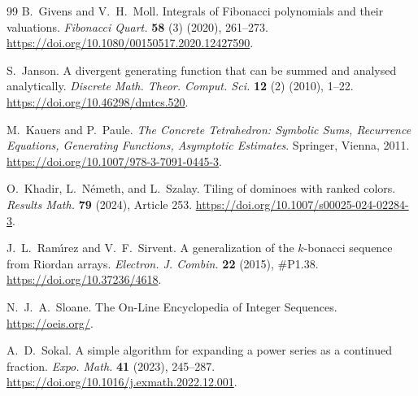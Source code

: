 \documentclass[11pt]{amsart}
\theoremstyle{plain}
\numberwithin{equation}{section}
\begin{document}
\begin{thebibliography}{99}
B.~Givens and V.~H.~Moll.
\newblock Integrals of Fibonacci polynomials and their valuations.
\newblock \emph{Fibonacci Quart.} \textbf{58} (3) (2020), 261--273.
\newblock \url{https://doi.org/10.1080/00150517.2020.12427590}.


S.~Janson.
\newblock A divergent generating function that can be summed and analysed
analytically.
\newblock \emph{Discrete Math. Theor. Comput. Sci.} \textbf{12} (2) (2010),
1--22.
\newblock \url{https://doi.org/10.46298/dmtcs.520}.

M.~Kauers and P.~Paule.
\newblock \emph{The Concrete Tetrahedron: Symbolic Sums, Recurrence Equations,
Generating Functions, Asymptotic Estimates}.
\newblock Springer, Vienna, 2011.
\newblock \url{https://doi.org/10.1007/978-3-7091-0445-3}.


O.~Khadir, L.~N\'emeth, and L.~Szalay.
\newblock Tiling of dominoes with ranked colors.
\newblock \emph{Results Math.} \textbf{79} (2024), Article 253.
\newblock \url{https://doi.org/10.1007/s00025-024-02284-3}.

J.~L.~Ram\'{\i}rez and V.~F.~Sirvent.
\newblock A generalization of the $k$-bonacci sequence from Riordan arrays.
\newblock \emph{Electron. J. Combin.} \textbf{22} (2015), \#P1.38.
\newblock \url{https://doi.org/10.37236/4618}.



N.~J.~A.~Sloane.
\newblock The On-Line Encyclopedia of Integer Sequences.
\newblock \url{https://oeis.org/}.

A.~D.~Sokal.
\newblock A simple algorithm for expanding a power series as a continued
fraction.
\newblock \emph{Expo. Math.} \textbf{41} (2023), 245--287.
\newblock \url{https://doi.org/10.1016/j.exmath.2022.12.001}.

\end{thebibliography}
\end{document}
